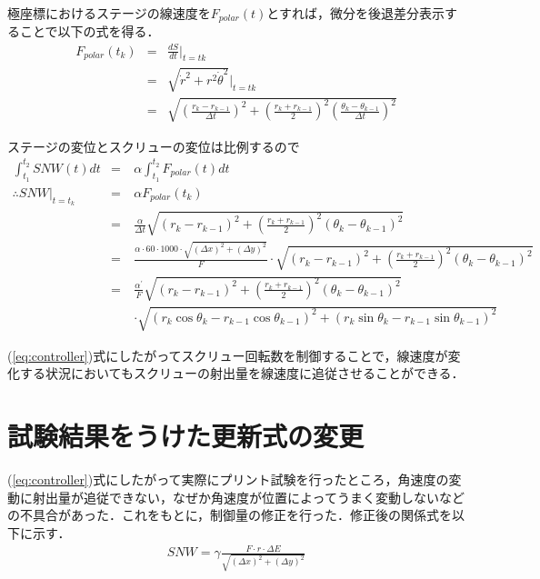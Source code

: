 \documentclass[twocolumn,oneside,a4paper]{article}
\begin{document}
極座標におけるステージの線速度を$F_{polar}(t)$とすれば，微分を後退差分表示することで以下の式を得る．
\begin{eqnarray*}
F_{polar}(t_k) &=& \frac{d S}{d t}\Bigg|_{t=tk} \\
&=& \sqrt{\dot{r}^2+r^2 \dot{\theta}^2}\Big|_{t=tk} \\
&=& \sqrt{\left( \frac{r_k - r_{k-1}}{\Delta t} \right)^2 + \left(\frac{r_k+r_{k-1}}{2} \right)^2 \left( \frac{\theta_k - \theta_{k-1} }{\Delta t} \right)^2}	
\end{eqnarray*}

ステージの変位とスクリューの変位は比例するので
\begin{eqnarray}\label{eq:controller}
\int_{t_1}^{t_2} SNW(t)dt &=& \alpha \int_{t_1}^{t_2} F_{polar}(t) dt \nonumber \\
\therefore SNW\big|_{t=t_k} &=& \alpha F_{polar}(t_k)  \nonumber \\
&=& \frac{\alpha}{\Delta t} \sqrt{\left( r_k - r_{k-1} \right)^2 + \left(\frac{r_k+r_{k-1}}{2} \right)^2 \left( \theta_k - \theta_{k-1} \right)^2} \nonumber \\
&=& \frac{\alpha \cdot 60\cdot1000 \cdot \sqrt{(\Delta x)^2+(\Delta y)^2}}{F} \cdot \sqrt{\left( r_k - r_{k-1} \right)^2 + \left(\frac{r_k+r_{k-1}}{2} \right)^2  \left( \theta_k - \theta_{k-1} \right)^2} \nonumber \\
&=& \frac{\alpha^\prime}{F} \sqrt{\left( r_k - r_{k-1} \right)^2 + \left(\frac{r_k+r_{k-1}}{2} \right)^2  \left( \theta_k - \theta_{k-1} \right)^2 }  \nonumber \\
&\quad& \cdot \sqrt{ (r_k \cos\theta_k - r_{k-1} \cos\theta_{k-1})^2+(r_k \sin\theta_k - r_{k-1} \sin\theta_{k-1})^2 }
\end{eqnarray}

(\ref{eq:controller})式にしたがってスクリュー回転数を制御することで，線速度が変化する状況においてもスクリューの射出量を線速度に追従させることができる．

\clearpage

\section{試験結果をうけた更新式の変更}
(\ref{eq:controller})式にしたがって実際にプリント試験を行ったところ，角速度の変動に射出量が追従できない，なぜか角速度が位置によってうまく変動しないなどの不具合があった．これをもとに，制御量の修正を行った．修正後の関係式を以下に示す．
\begin{eqnarray}\label{eq:fix}
  SNW = \gamma \frac{F\cdot r\cdot  \Delta E}{\sqrt{(\Delta x)^2+(\Delta y)^2}} \nonumber 
\end{eqnarray}
\end{document}
